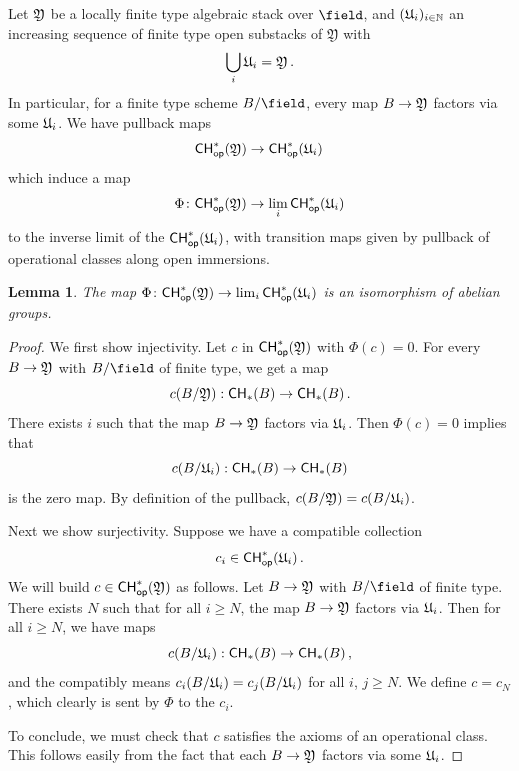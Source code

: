 \documentclass[a4paper,12pt]{article} %
\newcommand{\bb}[1]{{\mathbb{#1}}}
\newcommand{\sub}{\subseteq}
\theoremstyle{definition}
\theoremstyle{plain}%
\newtheorem{lemma}[definition]{Lemma}
\newcommand{\Chow}{\mathsf{CH}}
\newcommand{\CHop}{\Chow_{\mathsf{op}}}
\begin{document}
Let $\frak Y$ be a locally finite type algebraic stack over ${\field}$, and $(\frak U_i)_{i \in \bb N}$ an increasing sequence of finite type open substacks of $\mathfrak Y$ with 
$$\bigcup_i \frak U_i =  \frak Y\, .$$
In particular, for a finite type scheme $B/{\field}$, every
map $B \to \frak Y$ factors via some $\frak U_i$. We have pullback maps 
\begin{equation}
\CHop^*(\frak Y) \to \CHop^*(\frak U_i)\, 
\end{equation}
which induce a map 
\begin{equation}\label{eq:chop_lim}
\Phi\colon \CHop^*(\frak Y) \to \lim_i \CHop^*(\frak U_i)
\end{equation}
to the inverse limit of the $\CHop^*(\frak U_i)$, with transition maps given by pullback of operational classes along open immersions. 

\begin{lemma}\label{lem:chop_and_limits}
The map $\Phi\colon \CHop^*(\frak Y) \to \lim_i \CHop^*(\frak U_i)$ is an isomorphism of abelian groups. 
\end{lemma}
\begin{proof}
We first show injectivity. Let $c$ in $\CHop^*(\frak Y)$ with $\Phi(c) = 0$. For every $B \to \frak Y$ with $B/{\field}$ of
finite type, we get a map $$c(B/\frak Y):\Chow_*(B) \to \Chow_*(B)\, . $$
There exists $i$ such that the map $B \to \frak Y$ factors via $\frak U_i$. Then $\Phi(c) = 0$ implies that
$$c(B/\frak U_i):\Chow_*(B) \to \Chow_*(B)$$ is the zero map. By definition of the pullback, $c(B/\frak Y) = c(B/\frak U_i)$.

Next we show surjectivity. Suppose we have a compatible collection 
$$c_i \in \CHop^*(\frak U_i)\, .$$
We will build $c \in \CHop^*(\frak Y)$ as follows.
Let $B \to  \frak Y$ with $B/{\field}$ of finite type. There exists $N$ such that for all $i\ge N$,
the map $B \to \frak Y$ factors via $\frak U_i$. Then for all $i \ge N$,
we have maps $$c(B/\frak U_i):\Chow_*(B) \to \Chow_*(B)\, ,$$
and the compatibly means $c_i(B/\frak U_i) = c_j(B/\frak U_i)$ for all $i$, $j \ge N$. 
We define $c = c_N$, which clearly is sent by $\Phi$ to
the $c_i$.

To conclude, we must check that $c$ satisfies the axioms of an operational class. This follows easily from the fact that each $B \to \frak Y$ factors via some $\frak U_i$. 
\end{proof}
\end{document}
